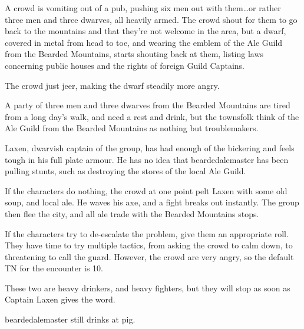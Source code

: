 \begin{multicols}{2}

\begin{boxtext}

	A crowd is vomiting out of a pub, pushing six men out with them\ldots or rather three men and three dwarves, all heavily armed.
	The crowd shout for them to go back to the mountains and that they're not welcome in the area, but a dwarf, covered in metal from head to toe, and wearing the emblem of the Ale Guild from the Bearded Mountains, starts shouting back at them, listing laws concerning public houses and the rights of foreign Guild Captains.

	The crowd just jeer, making the dwarf steadily more angry.

\end{boxtext}

A party of three men and three dwarves from the Bearded Mountains are tired from a long day's walk, and need a rest and drink, but the townsfolk think of the Ale Guild from the Bearded Mountains as nothing but troublemakers.

Laxen, dwarvish captain of the group, has had enough of the bickering and feels tough in his full plate armour.
He has no idea that \gls{beardedalemaster} has been pulling stunts, such as destroying the stores of the local Ale Guild.

If the characters do nothing, the crowd at one point pelt Laxen with some old soup, and local ale.
He waves his axe, and a fight breaks out instantly.
The group then flee the city, and all ale trade with the Bearded Mountains stops.

If the characters try to de-escalate the problem, give them an appropriate roll.
They have time to try multiple tactics, from asking the crowd to calm down, to threatening to call the guard.
However, the crowd are very angry, so the default TN for the encounter is 10.


These two are heavy drinkers, and heavy fighters, but they will stop as soon as Captain Laxen gives the word.



\Gls{beardedalemaster} still drinks at \gls{pig}.  


\end{multicols}
